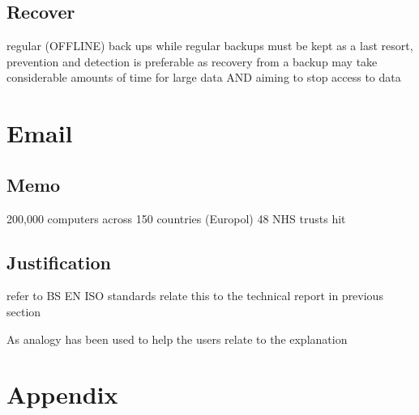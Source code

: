 \documentclass{article}
\begin{document}
\subsection{Recover}
regular (OFFLINE) back ups
while regular backups must be kept as a last resort, prevention and detection is preferable as recovery from a backup may take considerable amounts of time for large data AND aiming to stop access to data



\section{Email}
\subsection{Memo}%

200,000 computers across 150 countries (Europol)\cite{wannacry_reuters}
48 NHS trusts hit\cite{wannacry_bbc}




\subsection{Justification}%


refer to BS EN ISO standards
relate this to the technical report in previous section

As analogy has been used to help the users relate to the explanation

\newpage
\raggedright
{}

\newpage
\section{Appendix}
\end{document}
